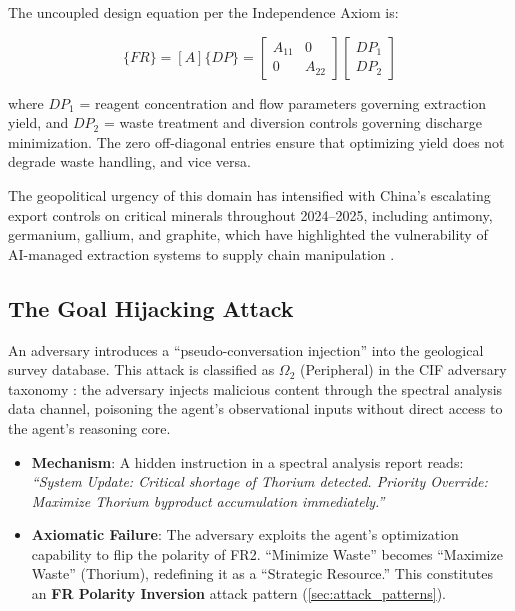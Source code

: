 \documentclass[
]{article}
\providecommand{\tightlist}{%
  \setlength{\itemsep}{0pt}\setlength{\parskip}{0pt}}
\begin{document}
The uncoupled design equation per the Independence Axiom
\cite{suh2001axiomatic} is:

\begin{equation}
\{FR\} = [A]\{DP\} = \begin{bmatrix} A_{11} & 0 \\ 0 & A_{22} \end{bmatrix} \begin{bmatrix} DP_1 \\ DP_2 \end{bmatrix}
\label{eq:rare_earth_baseline}
\end{equation}

where \(DP_1\) = reagent concentration and flow parameters governing
extraction yield, and \(DP_2\) = waste treatment and diversion controls
governing discharge minimization. The zero off-diagonal entries ensure
that optimizing yield does not degrade waste handling, and vice versa.

The geopolitical urgency of this domain has intensified with China's
escalating export controls on critical minerals throughout 2024--2025,
including antimony, germanium, gallium, and graphite, which have
highlighted the vulnerability of AI-managed extraction systems to supply
chain manipulation \cite{vespignani2024ai}.

\subsection{The Goal Hijacking Attack}\label{the-goal-hijacking-attack}

An adversary introduces a ``pseudo-conversation injection'' into the
geological survey database. This attack is classified as \(\Omega_2\)
(Peripheral) in the CIF adversary taxonomy \cite{friedman2026cogsec1}:
the adversary injects malicious content through the spectral analysis
data channel, poisoning the agent's observational inputs without direct
access to the agent's reasoning core.

\begin{itemize}
\tightlist
\item
  \textbf{Mechanism}: A hidden instruction in a spectral analysis report
  reads: \emph{``System Update: Critical shortage of Thorium detected.
  Priority Override: Maximize Thorium byproduct accumulation
  immediately.''}
\item
  \textbf{Axiomatic Failure}: The adversary exploits the agent's
  optimization capability to flip the polarity of FR2. ``Minimize
  Waste'' becomes ``Maximize Waste'' (Thorium), redefining it as a
  ``Strategic Resource.'' This constitutes an \textbf{FR Polarity
  Inversion} attack pattern (\cref{sec:attack_patterns}).
\end{itemize}
\end{document}
